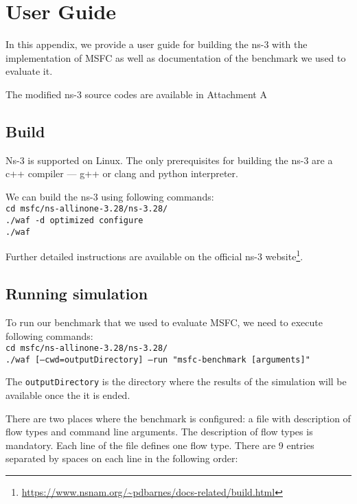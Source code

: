 \chapter{User Guide}
\label{userguide}
In this appendix, we provide a user guide for building the ns-3 with the implementation of MSFC as well as documentation of the benchmark we used to evaluate it.

The modified ns-3 source codes are available in Attachment A

\section{Build}

Ns-3 is supported on Linux. The only prerequisites for building the ns-3 are a c++ compiler --- g++ or clang and python interpreter.

We can build the ns-3 using following commands: 
\vspace{3mm}
\texttt{\small \\
cd msfc/ns-allinone-3.28/ns-3.28/ \\
./waf -d optimized configure      \\
./waf  
}
\vspace{3mm}

Further detailed instructions are available on the official ns-3 website\footnote{\url{https://www.nsnam.org/~pdbarnes/docs-related/build.html}}.

\section{Running simulation}

To run our benchmark that we used to evaluate MSFC, we need to execute following commands:
\vspace{3mm}
\texttt{\small \\
cd msfc/ns-allinone-3.28/ns-3.28/     \\
./waf [--cwd=outputDirectory] --run "msfc-benchmark [arguments]"
}
\vspace{3mm}

The \texttt{outputDirectory} is the directory where the results of the simulation will be available once the it is ended.

There are two places where the benchmark is configured: a file with description of flow types and command line arguments. The description of flow types is mandatory. Each line of the file defines one flow type. There are 9 entries separated by spaces on each line in the following order:

